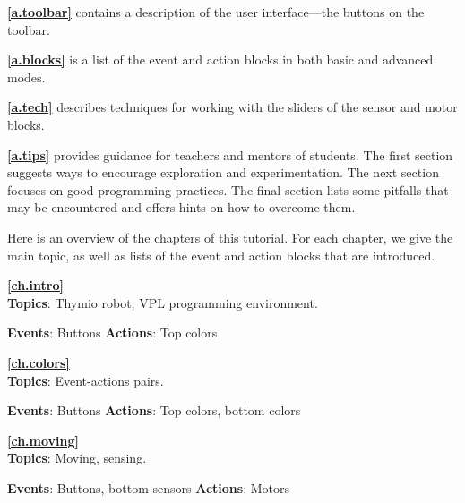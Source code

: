 
\textbf{\cref{a.toolbar}} contains a description of the user
interface---the buttons on the toolbar.

\textbf{\cref{a.blocks}} is a list of the event and
action blocks in both basic and advanced modes.

\textbf{\cref{a.tech}} describes techniques for working with the
sliders of the sensor and motor blocks.

\textbf{\cref{a.tips}} provides guidance for teachers and
mentors of students. The first section suggests ways to encourage
exploration and experimentation. The next section focuses on good
programming practices. The final section lists some pitfalls that may be
encountered and offers hints on how to overcome them.

\bigskip


Here is an overview of the chapters of this tutorial. For each chapter,
we give the main topic, as well as lists of the event and action
blocks that are introduced.

{\centering \textbf{\cref{ch.intro}}\\}
\textbf{Topics}: Thymio robot, VPL programming environment.

\textbf{Events}: Buttons \hfill \textbf{Actions}: Top colors

 \hfill {}

\bigskip

{\centering \textbf{\cref{ch.colors}}\\}
\textbf{Topics}: Event-actions pairs.

\textbf{Events}: Buttons \hfill \textbf{Actions}: Top colors, bottom colors

 \hfill {} \quad {}

\bigskip

{\centering \textbf{\cref{ch.moving}}\\}
\textbf{Topics}: Moving, sensing.

\textbf{Events}: Buttons, bottom sensors \hfill \textbf{Actions}: Motors

 \quad {} \hfill  {}

